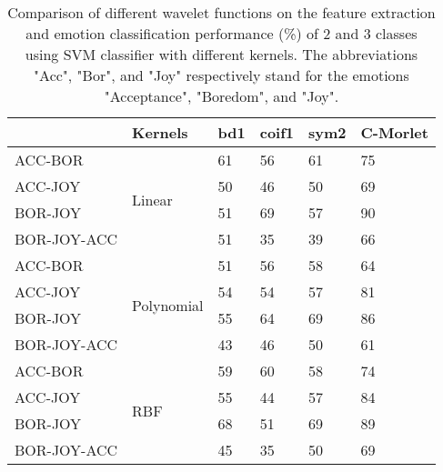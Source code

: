 \begin{table}[tbp]
	\begin{center}
	\caption{Comparison of different wavelet functions on the feature extraction and emotion classification performance (\%) of 
		2 and 3 classes using SVM classifier with different kernels. The abbreviations "Acc", "Bor", and "Joy"
		respectively stand for the emotions "Acceptance", "Boredom", and "Joy".}
		\vspace{3mm}
	\label{edaresult}
	\begin{tabular}{llllll}
		\hline
		& Kernels                     & bd1 & coif1 & sym2 & C-Morlet \\ \hline
		ACC-BOR     & \multirow{4}{*}{Linear}     & 61  & 56    & 61   & 75       \\
		ACC-JOY     &                             & 50  & 46    & 50   & 69       \\
		BOR-JOY     &                             & 51  & 69    & 57   & 90       \\
		BOR-JOY-ACC &                             & 51  & 35    & 39   & 66       \\ \hline
		ACC-BOR     & \multirow{4}{*}{Polynomial} & 51  & 56    & 58   & 64       \\
		ACC-JOY     &                             & 54  & 54    & 57   & 81       \\
		BOR-JOY     &                             & 55  & 64    & 69   & 86       \\
		BOR-JOY-ACC &                             & 43  & 46    & 50   & 61       \\ \hline
		ACC-BOR     & \multirow{4}{*}{RBF}        & 59  & 60    & 58   & 74       \\
		ACC-JOY     &                             & 55  & 44    & 57   & 84       \\
		BOR-JOY     &                             & 68  & 51    & 69   & 89       \\
		BOR-JOY-ACC &                             & 45  & 35    & 50   & 69       \\ \hline
	\end{tabular}
 \label{edaresult}
\end{center}
\end{table}

